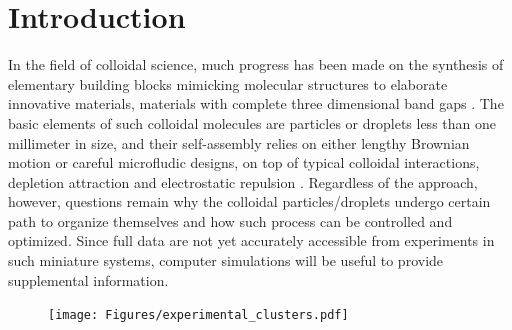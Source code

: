 

\section{Introduction}
\label{intro}

In the field of colloidal science, much progress has been made on the synthesis of elementary building blocks  mimicking molecular structures to elaborate innovative materials, \eg materials with complete three dimensional band gaps \citep{Xia_etal_AM2000, Velev_etal_AM2009, Li_etal_AC2011, Sacanna_etal_COCIS2011}. The basic elements of such colloidal molecules are particles or droplets less than one millimeter in size, and their self-assembly relies on either lengthy Brownian motion or careful microfludic designs, on top of typical colloidal interactions, \eg depletion attraction and electrostatic repulsion \citep{Mewis_colloidal, Yi_etal_CM2013, Shen_AS_2016}. Regardless of the approach, however, questions remain why the colloidal particles/droplets undergo certain path to organize themselves and how such process can be controlled and optimized. Since full data are not yet accurately accessible from experiments in such miniature systems, computer simulations will be useful to provide supplemental information.

\begin{figure}[t!]
\centering
  \texttt{[image: Figures/experimental\_clusters.pdf]}
  \caption{}
  \label{fig:exp}
\end{figure}

